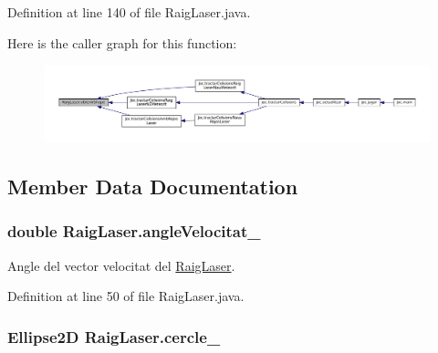 Definition at line 140 of file Raig\+Laser.\+java.



Here is the caller graph for this function\+:\nopagebreak
\begin{figure}[H]
\begin{center}
\leavevmode
\includegraphics[width=350pt]{class_raig_laser_abcf16e8249b1e7562d6fbcc6d408e7f4_icgraph}
\end{center}
\end{figure}




\subsection{Member Data Documentation}
\hypertarget{class_raig_laser_a2a0e32ff8599a77e2d1f315924c0da14}{}
\subsubsection[{angle\+Velocitat\+\_\+}]{\setlength{\rightskip}{0pt plus 5cm}double Raig\+Laser.\+angle\+Velocitat\+\_\+\hspace{0.3cm}{\ttfamily [private]}}\label{class_raig_laser_a2a0e32ff8599a77e2d1f315924c0da14}


Angle del vector velocitat del \hyperlink{class_raig_laser}{Raig\+Laser}. 



Definition at line 50 of file Raig\+Laser.\+java.

\hypertarget{class_raig_laser_a48b0b5a92a7424862bf6ebe59c498577}{}
\subsubsection[{cercle\+\_\+}]{\setlength{\rightskip}{0pt plus 5cm}Ellipse2\+D Raig\+Laser.\+cercle\+\_\+\hspace{0.3cm}{\ttfamily [private]}}\label{class_raig_laser_a48b0b5a92a7424862bf6ebe59c498577}


